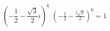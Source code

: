 { $\left(-\dfrac{1}{2} - \dfrac{\sqrt{3}}{2} i\right)^{6}$}
{ $\left(-\frac{1}{2} - \frac{i \sqrt{3}}{2}\right)^{6}=1$}
